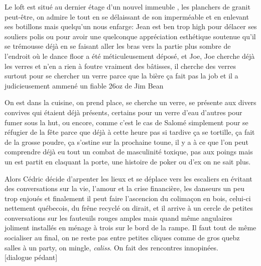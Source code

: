 Le loft est situé au dernier étage d'un nouvel immeuble , les planchers de granit peut-être, on admire
le tout en se délaissant de son imperméable et en enlevant ses botillons
mais quelqu'un nous enfarge: Jean est ben trop high pour délacer ses souliers
polis ou pour avoir une quelconque appréciation esthétique soutenue 
qu'il se trémousse déjà en se faisant aller les bras vers la partie
plus sombre de l'endroit où le dance floor a été méticuleusement déposé, et
Joe, Joe cherche déjà les verres et n'en a rien à foutre vraiment des bâtisses,
il cherche des
verres surtout pour se chercher un verre parce que la bière ça fait pas la job
et il a judicieusement ammené un fiable 26oz de Jim Bean 
\begin{comment}Le Jim
    Bean est un whiskey, un bourbon pour être plus précis, connu comme étant
    typiffiant de l'amérique avec un gros r sale, d'une toxicité masculine, avec
    sa bouteille nettement carrée et son petit coup de coude en fin de gorgée,
il est pas mal quand même.  Et pour le prix, pour le prix\ldots 
\end{comment}
\newpage
On est dans la cuisine, on prend place, se cherche un verre, se présente
aux divers convives qui étaient déjà présents, certains pour un verre d'eau
d'autres pour fumer sous la hut, ou encore, comme c'est le cas de Salomé
simplement pour se réfugier de la fête parce que déjà à cette heure pas si
tardive  ça se tortille, ça fait de la grosse poudre, ça s'ostine sur la
prochaine toune, il y a à ce que l'on peut comprendre déjà eu tout 
un combat de masculinité toxique, pas aux poings mais un est partit en claquant
la porte, une histoire de poker ou d'ex on ne sait plus. 

Alors Cédric décide d'arpenter les lieux et se déplace vers les escaliers 
en évitant des conversations sur la vie, l'amour et la crise financière,
les danseurs un peu trop enjoués et finalement il peut faire l'ascencion du 
colimaçon en bois, celui-ci nettement québecois, du frêne recyclé on dirait,
et il arrive à un cercle de petites conversations sur les fauteuils rouges
amples mais quand même angulaires joliment installés en ménage à trois sur le
bord de la rampe. Il faut tout de même socialiser au final,
on ne reste pas entre petites cliques comme de gros quebz salles à un party, on
mingle, \emph{caliss}. On fait des
rencontres innopinées.
\\

[dialogue pédant]\\


